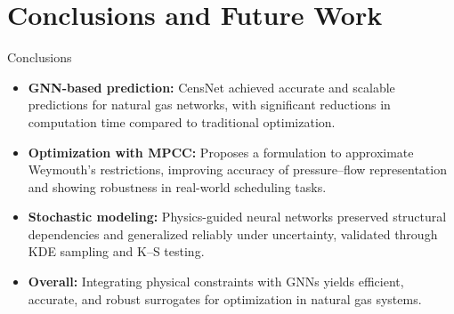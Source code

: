 \documentclass[hyperref={colorlinks,citecolor=blue,linkcolor=blue,urlcolor=blue}]{beamer}
\begin{document}
\section{Conclusions and Future Work}
\begin{frame}{Conclusions}
    \begin{itemize}
        \item \textbf{GNN-based prediction:} CensNet achieved accurate and scalable predictions for natural gas networks, with significant reductions in computation time compared to traditional optimization.
        \item \textbf{Optimization with MPCC:} Proposes a formulation to approximate Weymouth's restrictions, improving accuracy of pressure–flow representation and showing robustness in real-world scheduling tasks.
        \item \textbf{Stochastic modeling:} Physics-guided neural networks preserved structural dependencies and generalized reliably under uncertainty, validated through KDE sampling and K–S testing.
        \item \textbf{Overall:} Integrating physical constraints with GNNs yields efficient, accurate, and robust surrogates for optimization in natural gas systems.
    \end{itemize}
\end{frame}

\end{document}
